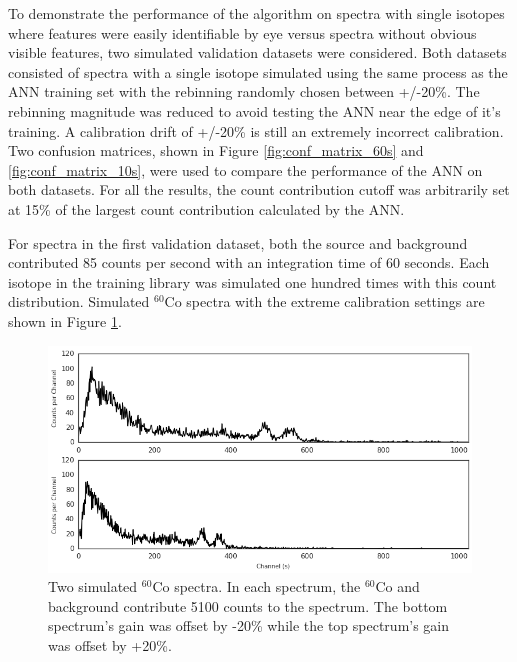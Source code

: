 \documentclass[tocnosub,noragright,centerchapter,12pt,fullpage]{uiucecethesis09}
\begin{document}
To demonstrate the performance of the algorithm on spectra with single isotopes where features were easily identifiable by eye versus spectra without obvious visible features, two simulated validation datasets were considered. Both datasets consisted of spectra with a single isotope simulated using the same process as the ANN training set with the rebinning randomly chosen between +/-20\%. The rebinning magnitude was reduced to avoid testing the ANN near the edge of it's training. A calibration drift of +/-20\% is still an extremely incorrect calibration. Two confusion matrices, shown in Figure \ref{fig:conf_matrix_60s} and \ref{fig:conf_matrix_10s}, were used to compare the performance of the ANN on both datasets. For all the results, the count contribution cutoff was arbitrarily set at 15\% of the largest count contribution calculated by the ANN.


For spectra in the first validation dataset, both the source and background contributed 85 counts per second with an integration time of 60 seconds. Each isotope in the training library was simulated one hundred times with this count distribution. Simulated $^{60}$Co spectra with the extreme calibration settings are shown in Figure \ref{fig:co60_diff_pmt_60s}.



\begin{figure}[H]
\centering
\includegraphics[width=0.75\linewidth]{images/Co60_both_60s}
\caption{Two simulated $^{60}$Co spectra. In each spectrum, the $^{60}$Co and background contribute 5100 counts to the spectrum. The bottom spectrum's gain was offset by -20\% while the top spectrum's gain was offset by +20\%.}
\label{fig:co60_diff_pmt_60s}
\end{figure}
\end{document}

